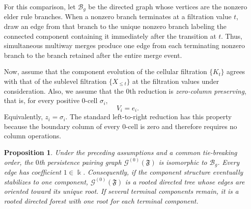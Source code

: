 \documentclass[11pt]{article}
\theoremstyle{paperdefinition}
\theoremstyle{paperplain}
\newtheorem{proposition}[definition]{Proposition}
\theoremstyle{paperremark}
\begin{document}
For this comparison, let $\mathcal B_g$ be the directed graph whose vertices are the nonzero elder rule branches. When a nonzero branch terminates at a filtration value $t$, draw an edge from that branch to the unique nonzero branch labeling the connected component containing it immediately after the transition at $t$. Thus, simultaneous multiway merges produce one edge from each terminating nonzero branch to the branch retained after the entire merge event.

Now, assume that the component evolution of the cellular filtration $\{K_t\}$ agrees with that of the sublevel filtration $\{X_{\leq t}\}$ at the filtration values under consideration. Also, we assume that the $0$th reduction is \emph{zero-column preserving}, that is, for every positive $0$-cell $\sigma_i$,
\[
V_i=e_i.
\]
Equivalently, $z_i=\sigma_i$. The standard left-to-right reduction has this property because the boundary column of every $0$-cell is zero and therefore requires no column operations.

\begin{proposition}
\label{prop:h0-pairing-graph-merge-tree}
Under the preceding assumptions and a common tie-breaking order, the $0$th persistence pairing graph $\mathcal G^{(0)}(\mathfrak F)$ is isomorphic to $\mathcal B_g$. Every edge has coefficient $1\in\Bbbk$. Consequently, if the component structure eventually stabilizes to one component, $\mathcal G^{(0)}(\mathfrak F)$ is a rooted directed tree whose edges are oriented toward its unique root. If several terminal components remain, it is a rooted directed forest with one root for each terminal component.
\end{proposition}
\end{document}
